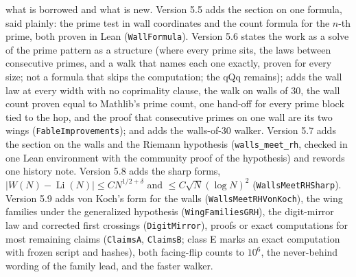\documentclass[11pt]{article}
\begin{document}
what is borrowed and what is new. Version 5.5 adds the section on one formula, said plainly: the prime test in wall coordinates and the count formula for the $n$-th prime, both proven in Lean (\texttt{WallFormula}). Version 5.6 states the work as a solve of the prime pattern as a structure (where every prime sits, the laws between consecutive primes, and a walk that names each one exactly, proven for every size; not a formula that skips the computation; the qQq remains); adds the wall law at every width with no coprimality clause, the walk on walls of $30$, the wall count proven equal to Mathlib's prime count, one hand-off for every prime block tied to the hop, and the proof that consecutive primes on one wall are its two wings (\texttt{FableImprovements}); and adds the walls-of-$30$ walker. Version 5.7 adds the section on the walls and the Riemann hypothesis (\texttt{walls\_meet\_rh}, checked in one Lean environment with the community proof of the hypothesis) and rewords one history note. Version 5.8 adds the sharp forms, $|W(N)-\operatorname{Li}(N)| \le C N^{1/2+\delta}$ and $\le C\sqrt{N}(\log N)^2$ (\texttt{WallsMeetRHSharp}). Version 5.9 adds von Koch's form for the walls (\texttt{WallsMeetRHVonKoch}), the wing families under the generalized hypothesis (\texttt{WingFamiliesGRH}), the digit-mirror law and corrected first crossings (\texttt{DigitMirror}), proofs or exact computations for most remaining claims (\texttt{ClaimsA}, \texttt{ClaimsB}; class E marks an exact computation with frozen script and hashes), both facing-flip counts to $10^6$, the never-behind wording of the family lead, and the faster walker.
\end{document}
